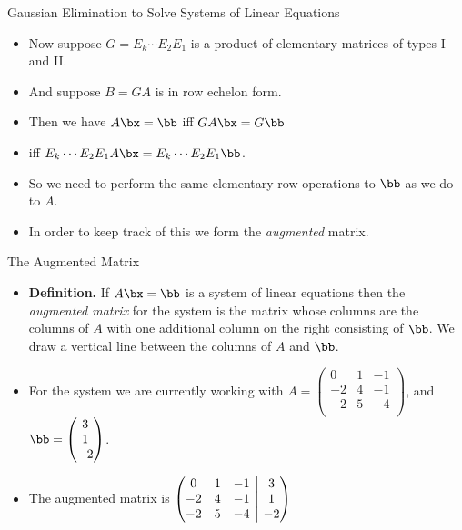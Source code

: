 \documentclass{beamer}
\begin{document}

\begin{frame}{Gaussian Elimination to Solve Systems of Linear Equations}

\begin{itemize}
\item Now suppose $G = E_k \cdots E_2 E_1$ is a product of elementary matrices of types I and II.
\item And suppose $B = G A$ is in row echelon form.
\item Then we have $A\bx=\bb$ iff $GA\bx = G\bb$
\item iff $E_k \cdots E_2 E_1 A \bx = E_k \cdots E_2 E_1 \bb$.
\item So we need to perform the same elementary row operations to $\bb$ as we do to
$A$.
\item In order to keep track of this we form the \emph{augmented} matrix.
\end{itemize}
\end{frame}


\newcommand\aug{\fboxsep=-\fboxrule\!\!\!\fbox{\strut}\!\!\!}

\begin{frame}{The Augmented Matrix}

\begin{itemize}
\item \textbf{Definition.} If $A\bx=\bb$ is a system of linear equations then the
\emph{augmented matrix} for the system is the matrix whose columns are the columns
of $A$ with one additional column on the right consisting of $\bb$. We draw
a vertical line between the columns of $A$ and $\bb$.
\item For the system we are currently working with
$A=
\begin{pmatrix}
 0 & 1 & -1 \\
-2 & 4 & -1 \\
-2 & 5 & -4 \\
\end{pmatrix}
$,
and
$
\bb =
\begin{pmatrix}
3 \\ 1 \\ -2
\end{pmatrix}
$.
\item The augmented matrix is
$
\begin{pmatrix}
 0 & 1 & -1  &  \aug & 3  \\
-2 & 4 & -1  &  \aug & 1  \\
-2 & 5 & -4  &  \aug & -2  \\
\end{pmatrix}
$
\end{itemize}
\end{frame}
\end{document}
